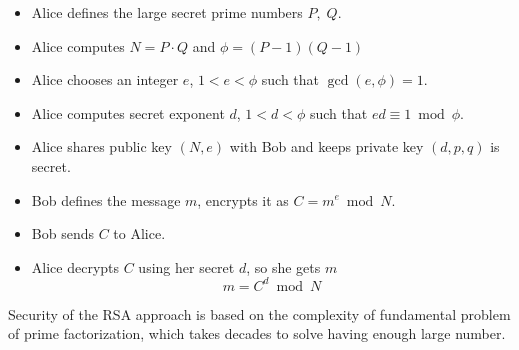 \documentclass[12pt,letterpaper,oneside,reqno]{amsart}
\begin{document}
    \begin{itemize}
        \item Alice defines the large secret prime numbers $P, \; Q$.
        \item Alice computes $N = P \cdot Q$ and $\phi = (P-1)(Q-1)$
        \item Alice chooses an integer $e$, $1<e< \phi$ such that $\gcd(e, \phi) = 1$.
        \item Alice computes secret exponent $d$, $1<d< \phi$ such that $ed \equiv 1 \bmod \phi$.
        \item Alice shares public key $(N,e)$ with Bob and keeps private key $(d, p, q)$ is secret.
        \item Bob defines the message $m$, encrypts it as $C = m^{e} \bmod N$.
        \item Bob sends $C$ to Alice.
        \item Alice decrypts $C$ using her secret $d$, so she gets $m$
        \[
            m = C^d \bmod N
        \]
    \end{itemize}
    Security of the RSA approach is based on the complexity of fundamental problem of prime factorization,
    which takes decades to solve having enough large number.

    
    
\end{document}
